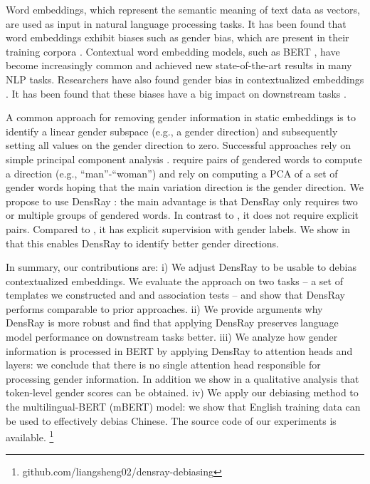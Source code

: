 Word embeddings, which represent the semantic meaning of
text data as vectors, are used as input in natural language
processing tasks. It has been found that word embeddings
exhibit biases such as gender bias, which are present in their training
corpora \cite{bolukbasi2016man,caliskan2017semantics,garg2018word}. Contextual word
embedding models, such as BERT \cite{devlin2018bert}, have
become increasingly common and achieved new state-of-the-art
results in many NLP tasks. Researchers have also found
gender bias in contextualized
embeddings \cite{zhao2019gender,may2019measuring}. It has been found that these biases have a big impact on downstream tasks \cite{vanmassenhove-etal-2018-getting,moryossef-etal-2019-filling,rudinger2018gender,zhao2018gender}.

A common approach for removing gender information in static
embeddings is to identify a linear gender subspace (e.g., a
gender direction) and subsequently setting all values on the
gender direction to zero. Successful approaches rely on simple
principal component
analysis \cite{bolukbasi2016man,mu2018all}. 
require pairs of gendered words to compute a direction
(e.g., ``man''-``woman'') and  rely on
computing a PCA of a set of gender words hoping that the
main variation direction is the gender direction. We propose to use
DensRay \cite{dufter2019analytical}: the main advantage is
that DensRay only requires two or multiple groups of
gendered words. In contrast to , it
does not require explicit pairs. Compared
to , it has explicit supervision with gender
labels. We show in  that this enables
DensRay to identify better gender directions.

In summary, our contributions are: 
i) We adjust DensRay to be usable to debias contextualized embeddings.
We evaluate the approach on two tasks -- a set of templates
we constructed and and association tests -- and show that DensRay performs comparable to prior approaches. 
ii) We provide arguments why DensRay is more robust and find that applying DensRay preserves language model performance on downstream tasks better.
iii) We analyze how gender information is processed in BERT by applying DensRay to attention heads and layers: we conclude that there is no single attention head responsible for processing gender information. In addition we show in a qualitative analysis that token-level gender scores can be obtained. 
iv) We apply our debiasing method to the multilingual-BERT (mBERT) model: we show that English training data can be used to effectively debias Chinese. The source code
of our experiments is available. \footnote{github.com/liangsheng02/densray-debiasing}
